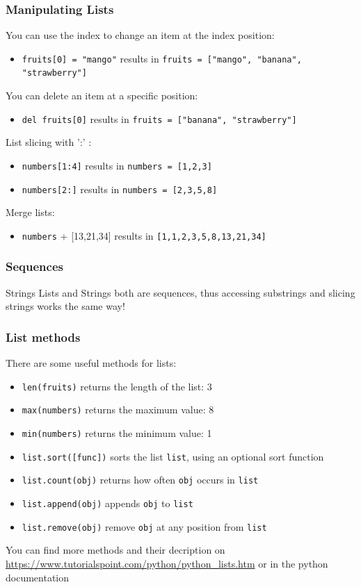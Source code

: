 \documentclass{beamer}
\begin{document}
\begin{frame}
\frametitle{Manipulating Lists}
	You can use the index to change an item at the index position:
	\begin{itemize}
	\item \texttt{fruits[0] = "mango"} results in \texttt{fruits = ["mango", "banana", "strawberry"]}
	\end{itemize}
	You can delete an item at a specific position:
	\begin{itemize}
	\item \texttt{del fruits[0]} results in \texttt{fruits = ["banana", "strawberry"]}
	\end{itemize}
	List slicing with ':' :
	\begin{itemize}
	\item \texttt{numbers[1:4]} results in \texttt{numbers = [1,2,3]}
	\item \texttt{numbers[2:]} results in \texttt{numbers = [2,3,5,8]}
	\end{itemize}
	Merge lists:
	\begin{itemize}
	\item \texttt{numbers} + [13,21,34] results in \texttt{[1,1,2,3,5,8,13,21,34]}
	\end{itemize}
\end{frame}

\begin{frame}
\frametitle{Sequences}
	\begin{alertblock}{Strings}
		Lists and Strings both are sequences, thus accessing substrings and slicing strings works the same way!
	\end{alertblock}
\end{frame}

\begin{frame}
\frametitle{List methods}
	There are some useful methods for lists:
	\begin{itemize}
	\item \texttt{len(fruits)} returns the length of the list: 3
	\item \texttt{max(numbers)} returns the maximum value: 8
	\item \texttt{min(numbers)} returns the minimum value: 1
	\item \texttt{list.sort([func])} sorts the list \texttt{list}, using an optional sort function
	\item \texttt{list.count(obj)} returns how often \texttt{obj} occurs in \texttt{list}
	\item \texttt{list.append(obj)} appends \texttt{obj} to \texttt{list}
	\item \texttt{list.remove(obj)} remove \texttt{obj} at any position from \texttt{list}
	\end{itemize}
	You can find more methods and their decription on \url{https://www.tutorialspoint.com/python/python_lists.htm} or in the python documentation
\end{frame}
\end{document}
